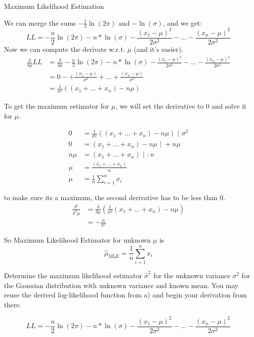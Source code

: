 \documentclass[
	english,
        solution=true
	]{tudaexercise}
\begin{document}
\begin{task}[points=20]{Maximum Likelihood Estimation}
\begin{subtask}[points=7]
\begin{solution}
We can merge the sums $-\frac{1}{2} \ln(2\pi)$ and $-\ln(\sigma)$, and we get:
\[LL=-\frac{n}{2} \ln(2\pi) - n * \ln(\sigma) - \frac{(x_1-\mu)^2}{2\sigma^2}-...- \frac{(x_n-\mu)^2}{2\sigma^2}\]
Now we can compute the derivate w.r.t. $\mu$ (and it's easier).
\begin{align*}
    \frac{\delta}{ \delta \mu} LL &= \frac{\delta}{\delta \mu} -\frac{n}{2} \ln(2\pi) - n * \ln(\sigma) - \frac{(x_1-\mu)^2}{2\sigma^2}-...- \frac{(x_n-\mu)^2}{2\sigma^2} \\
    &= 0 - + \frac{(x_1-\mu)}{\sigma^2}+...+\frac{(x_n-\mu)}{\sigma^2} \\
    &= \frac{1}{\sigma^2}((x_1+...+x_n)-n\mu)
\end{align*}

To get the maximum estimator for $\mu$, we will set the derivative to $0$ and solve it for $\mu$.

\begin{align*}
    0 &= \frac{1}{\sigma^2}((x_1+...+x_n)-n\mu) \text{  | } \sigma^2\\
    0 &= (x_1+...+x_n)-n\mu \text{  | } +n\mu \\
    n\mu &= (x_1+...+x_n) \text{  | } :n \\
    \mu &= \frac{(x_1+...+x_n)}{n} \\
    \mu &= \frac{1}{n} \sum^n_{i=1} x_i
\end{align*}

to make sure its a maximum, the second derivative has to be less than 0.
\begin{align*}
    \frac{\delta^2}{\delta^2 \mu} &= \frac{\delta}{\delta \mu}(\frac{1}{\sigma^2}(x_1+...+x_n)-n\mu) \\ 
    &= -\frac{n}{\sigma^2}
\end{align*}

So Maximum Likelihood Estimator for unknown $\mu$ is
\[\hat{\mu}_{\text{MLE}}= \frac{1}{n} \sum^n_{i=1} x_i\]

\end{solution}
\end{subtask}


\begin{subtask}[points=5]

Determine the maximum likelihood estimator $\hat{\sigma}^{2}$ for the unknown variance \( \sigma^2 \) for the Gaussian distribution with unknown variance and known mean. You may reuse the derived log-likelihood function from a) and begin your derivation from there. 

\begin{solution}
\[LL=-\frac{n}{2} \ln(2\pi) - n * \ln(\sigma) - \frac{(x_1-\mu)^2}{2\sigma^2}-...- \frac{(x_n-\mu)^2}{2\sigma^2}\]


\end{solution}
\end{subtask}
\end{task}
\end{document}
